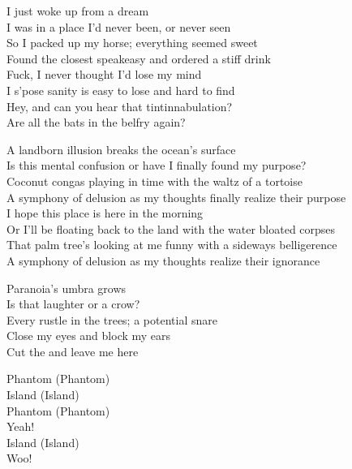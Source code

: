 



I just woke up from a dream\\
I was in a place I'd never been, or never seen\\
So I packed up my horse; everything seemed sweet\\
Found the closest speakeasy and ordered a stiff drink\\

Fuck, I never thought I'd lose my mind\\
I s'pose sanity is easy to lose and hard to find\\
Hey, and can you hear that tintinnabulation?\\
Are all the bats in the belfry again?\\


A landborn illusion breaks the ocean's surface\\
Is this mental confusion or have I finally found my purpose?\\
Coconut congas playing in time with the waltz of a tortoise\\
A symphony of delusion as my thoughts finally realize their purpose\\
I hope this place is here in the morning\\
Or I'll be floating back to the land with the water bloated corpses\\
That palm tree's looking at me funny with a sideways belligerence\\
A symphony of delusion as my thoughts realize their ignorance\\


Paranoia's umbra grows\\
Is that laughter or a crow?\\
Every rustle in the trees; a potential snare\\
Close my eyes and block my ears\\
Cut the  and leave me here\\


Phantom (Phantom)\\
Island (Island)\\
Phantom (Phantom)\\
Yeah!\\
Island (Island)\\
Woo!\\

